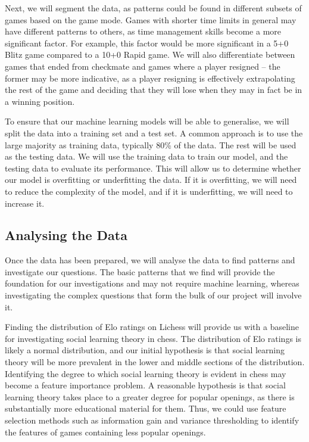 \documentclass[%
 superscriptaddress,
showpacs,preprintnumbers,
 amsmath,
 amssymb,
 aps,
 pra,
showkeys,
onecolumn,
notitlepage,
11pt,
tightenlines      %
]{revtex4-1}
\begin{document}
Next, we will segment the data, as patterns could be found in different subsets of games based on the game mode. Games with shorter time limits in general may have different patterns to others, as time management skills become a more significant factor. For example, this factor would be more significant in a 5+0 Blitz game compared to a 10+0 Rapid game. We will also differentiate between games that ended from checkmate and games where a player resigned -- the former may be more indicative, as a player resigning is effectively extrapolating the rest of the game and deciding that they will lose when they may in fact be in a winning position.

To ensure that our machine learning models will be able to generalise, we will split the data into a training set and a test set. A common approach is to use the large majority as training data, typically 80\% of the data. The rest will be used as the testing data. We will use the training data to train our model, and the testing data to evaluate its performance. This will allow us to determine whether our model is overfitting or underfitting the data. If it is overfitting, we will need to reduce the complexity of the model, and if it is underfitting, we will need to increase it.

\subsection{Analysing the Data}
Once the data has been prepared, we will analyse the data to find patterns and investigate our questions. The basic patterns that we find will provide the foundation for our investigations and may not require machine learning, whereas investigating the complex questions that form the bulk of our project will involve it.

Finding the distribution of Elo ratings on Lichess will provide us with a baseline for investigating social learning theory in chess. The distribution of Elo ratings is likely a normal distribution, and our initial hypothesis is that social learning theory will be more prevalent in the lower and middle sections of the distribution. Identifying the degree to which social learning theory is evident in chess may become a feature importance problem. A reasonable hypothesis is that social learning theory takes place to a greater degree for popular openings, as there is substantially more educational material for them. Thus, we could use feature selection methods such as information gain and variance thresholding to identify the features of games containing less popular openings.
\end{document}
